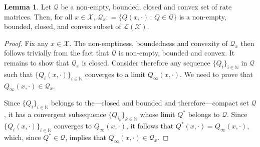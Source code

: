 \documentclass[10pt,a4paper]{paper}
\theoremstyle{definition}
\newtheorem{lemma}[theorem]{Lemma}
\newcommand{\nats}{\mathbb{N}}
\newcommand{\states}{\mathcal{X}}
\newcommand{\gambles}{\mathcal{L}}
\newcommand{\gamblesX}{\gambles(\states)}
\newcommand{\rateset}{\mathcal{Q}}
\newcommand{\coloneqq}{:\!=}
\begin{document}
\begin{lemma}\label{lemma:rows_nonempty_bounded_closed_convex}
Let $\rateset$ be a non-empty, bounded, closed and convex set of rate matrices. Then, for all $x\in\states$, $\rateset_x\coloneqq\{Q(x,\cdot)\,:\,Q\in\rateset\}$ is a non-empty, bounded, closed, and convex subset of $\gamblesX$.
\end{lemma}
\begin{proof}
Fix any $x\in\states$. The non-emptiness, boundedness and convexity of $\rateset_x$ then follows trivially from the fact that $\rateset$ is non-empty, bounded and convex. It remains to show that $\rateset_x$ is closed. Consider therefore any sequence $\{Q_i\}_{i\in\nats}$ in $\rateset$ such that $\{Q_i(x,\cdot)\}_{i\in\nats}$ converges to a limit $Q_{\infty}(x,\cdot)$. We need to prove that $Q_{\infty}(x,\cdot)\in\rateset_x$.

Since $\{Q_i\}_{i\in\nats}$ belongs to the---closed and bounded and therefore---compact set $\rateset$, it has a convergent subsequence $\{Q_{i_k}\}_{k\in\nats}$ whose limit $Q^*$ belongs to $\rateset$. Since $\{Q_i(x,\cdot)\}_{i\in\nats}$ converges to $Q_{\infty}(x,\cdot)$, it follows that $Q^*(x,\cdot)=Q_{\infty}(x,\cdot)$, which, since $Q^*\in\rateset$, implies that $Q_{\infty}(x,\cdot)\in\rateset_x$.
\end{proof}
\end{document}
